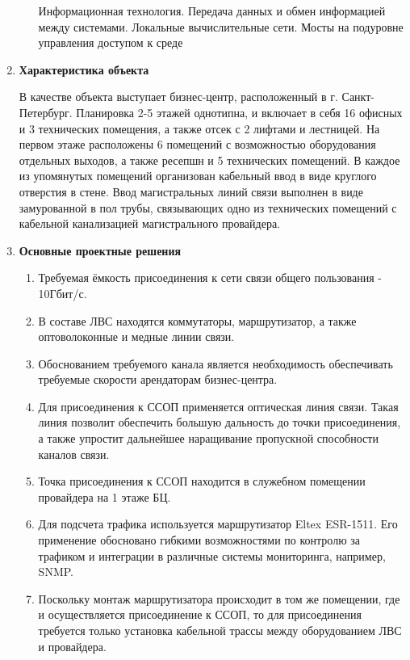 \documentclass[a4paper,14pt]{extarticle}
\begin{document}
\begin{enumerate}
\begin{enumerate}
            Информационная технология. Передача данных и обмен информацией между системами. Локальные вычислительные сети. Мосты на подуровне управления доступом к среде
        \end{enumerate}
        \item \textbf{Характеристика объекта}\par
        В качестве объекта выступает бизнес-центр, расположенный в г. Санкт-Петербург. Планировка 2-5 этажей однотипна, и 
        включает в себя 16 офисных и 3 технических помещения, а также отсек с 2 лифтами и лестницей. На первом этаже расположены 
        6 помещений с возможностью оборудования отдельных выходов, а также ресепшн и 5 технических помещений. В каждое из упомянутых 
        помещений организован кабельный ввод в виде круглого отверстия в стене. Ввод магистральных линий связи выполнен в виде 
        замурованной в пол трубы, связывающих одно из технических помещений с кабельной канализацией магистрального провайдера. 
        \item \textbf{Основные проектные решения}\par
        \begin{enumerate}
            \item Требуемая ёмкость присоединения к сети связи общего пользования - 10Гбит/с.
            \item В составе ЛВС находятся коммутаторы, маршрутизатор, а также оптоволоконные и медные линии связи.
            \item Обоснованием требуемого канала является необходимость обеспечивать требуемые скорости арендаторам бизнес-центра.
            \item Для присоединения к ССОП применяется оптическая линия связи. Такая линия позволит обеспечить большую дальность 
            до точки присоединения, а также упростит дальнейшее наращивание пропускной способности каналов связи.
            \item Точка присоединения к ССОП находится в служебном помещении провайдера на 1 этаже БЦ.
            \item Для подсчета трафика используется маршрутизатор Eltex ESR-1511. Его применение обосновано гибкими возможностями 
            по контролю за трафиком и интеграции в различные системы мониторинга, например, SNMP.
            \item Поскольку монтаж маршрутизатора происходит в том же помещении, где и осуществляется присоединение к ССОП, то для 
            присоединения требуется только установка кабельной трассы между оборудованием ЛВС и провайдера.

\end{enumerate}
\end{enumerate}
\end{document}
